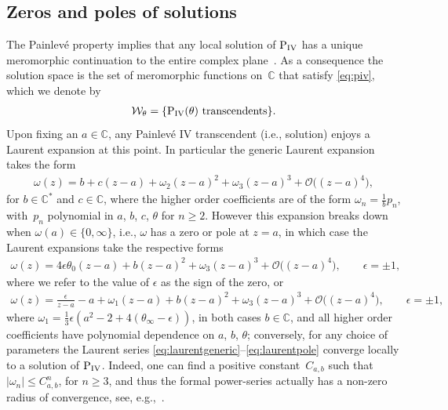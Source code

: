 \documentclass[pdftex]{sigma}
\numberwithin{equation}{section}
\newcommand{\om}{\omega}
\begin{document}
\subsection{Zeros and poles of solutions}
The Painlev\'e property implies that any local solution of ${\rm P}_{\rm IV}$ has a unique meromorphic continuation to the entire complex plane~\cite{steinmetz}. As a consequence the solution space is the set of meromorphic functions on~$\mathbb{C}$ that satisfy \eqref{eq:piv}, which we denote by
\begin{gather}\label{eq:defiwtheta}
\mathcal{W}_\theta=\{{\rm P}_\text{IV}(\theta) \ \text{transcendents}\}.
\end{gather}
Upon f\/ixing an $a\in \mathbb{C}$, any Painlev\'e IV transcendent (i.e., solution) enjoys a Laurent expansion at this point. In particular the generic Laurent expansion takes the form
\begin{gather}\label{eq:laurentgeneric}
\om(z)=b+c(z-a)+\om_2(z-a)^2+\om_3(z-a)^3+\mathcal{O}\big((z-a)^4\big),
\end{gather}
for $b\in\mathbb{C}^*$ and $c\in\mathbb{C}$, where the higher order coef\/f\/icients are of the form $\om_n=\frac{1}{b}p_n$, with~$p_n$ polynomial in $a$, $b$, $c$, $\theta$ for $n\geq 2$. However this expansion breaks down when $\omega(a)\in\{0,\infty\}$, i.e., $\omega$ has a zero or pole at $z=a$, in which case the Laurent expansions take the respective forms
\begin{gather}\label{eq:laurentzero}
\om(z)=4\epsilon\theta_0(z-a)+b(z-a)^2+\om_3(z-a)^3+\mathcal{O}\big((z-a)^4\big),\qquad \epsilon=\pm 1,
\end{gather}
where we refer to the value of $\epsilon$ as the sign of the zero, or
\begin{gather}\label{eq:laurentpole}
\om(z)=\frac{\epsilon}{z-a}-a+\om_1(z-a)+b(z-a)^2+\om_3(z-a)^3+\mathcal{O}\big((z-a)^4\big),\qquad \epsilon=\pm 1,
\end{gather}
where $\om_1=\tfrac{1}{3}\epsilon(a^2-2+4(\theta_\infty-\epsilon))$, in both cases $b\in\mathbb{C}$, and all higher order coef\/f\/icients have polynomial dependence on $a$, $b$, $\theta$; conversely, for any choice of parameters the Laurent series \eqref{eq:laurentgeneric}--\eqref{eq:laurentpole}
converge locally to a solution of ${\rm P}_{\rm IV}$. Indeed, one can f\/ind a positive constant~$C_{a,b}$ such that $|\omega_n|\leq C_{a,b}^n$, for $n\geq 3$, and thus the formal power-series actually has a non-zero radius of convergence, see, e.g.,~\cite{filipuk09, gromak}.
\end{document}
